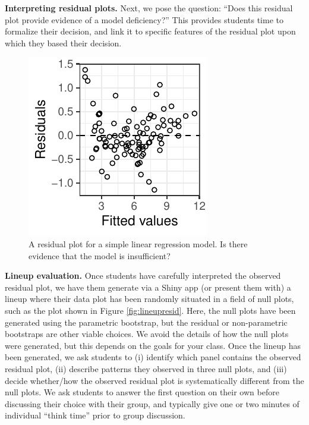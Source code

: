 \documentclass[12pt]{article}
\begin{document}
\textbf{Interpreting residual plots.} Next, we pose the question: ``Does
this residual plot provide evidence of a model deficiency?'' This
provides students time to formalize their decision, and link it to
specific features of the residual plot upon which they based their
decision.

\begin{figure}

{\centering \includegraphics{figs/observed_residual} 

}

\caption{\label{fig:residplot} A residual plot for a simple linear regression model. Is there evidence that the model is insufficient?}\label{fig:residual plot}
\end{figure}

\textbf{Lineup evaluation.} Once students have carefully interpreted the
observed residual plot, we have them generate via a Shiny app (or
present them with) a lineup where their data plot has been randomly
situated in a field of null plots, such as the plot shown in Figure
\ref{fig:lineupresid}. Here, the null plots have been generated using
the parametric bootstrap, but the residual or non-parametric bootstraps
are other viable choices. We avoid the details of how the null plots
were generated, but this depends on the goals for your class. Once the
lineup has been generated, we ask students to (i) identify which panel
contains the observed residual plot, (ii) describe patterns they
observed in three null plots, and (iii) decide whether/how the observed
residual plot is systematically different from the null plots. We ask
students to answer the first question on their own before discussing
their choice with their group, and typically give one or two minutes of
individual ``think time'' prior to group discussion.
\end{document}
